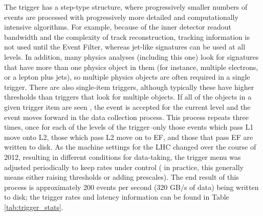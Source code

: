 %
 

The trigger has a step-type structure, where progressively smaller numbers of events are processed with progressively more 
detailed and computationally intensive algorithms.  For example, because of the inner detector readout
bandwidth and the complexity of track reconstruction, tracking information is not used until the Event Filter,
whereas jet-like signatures can be used at all levels.  
In addition, many physics analyses (including this one) look for signatures that have more than one physics object in 
them (for instance, multiple electrons, or a lepton plus jets), so multiple physics objects are often 
required in a single trigger.  There are also single-item triggers, although typically these have higher thresholds 
than triggers that look for multiple objects.  If all of the objects in a given trigger item are seen
, the event is accepted for the current level and the event moves forward in the data collection process.  
This process repeats three times, once for each of the levels of the trigger--only those events which 
pass L1 move onto L2, those which pass L2 move on to EF, and those that pass EF 
are written to disk.  As the machine settings for the LHC changed over the course of 2012, resulting 
in different conditions for data-taking, the trigger menu was adjusted periodically to keep rates under control (
in practice, this generally means either raising thresholds or adding prescales).  
The end result of this process is approximately 200 events 
per second (320 GB/s of data) being written to disk; the trigger rates and latency 
information can be found in Table \ref{tab:trigger_stats}.

